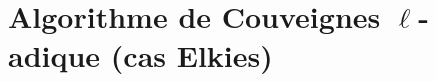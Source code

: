 \documentclass[10pt,a4paper]{beamer}
\theoremstyle{plain}
\theoremstyle{definition}
\theoremstyle{definition}
\theoremstyle{definition}
\theoremstyle{definition}
\theoremstyle{remark}
\theoremstyle{remark}
\begin{document}



\section{Algorithme de Couveignes $\ell$-adique (cas Elkies)}
\end{document}
